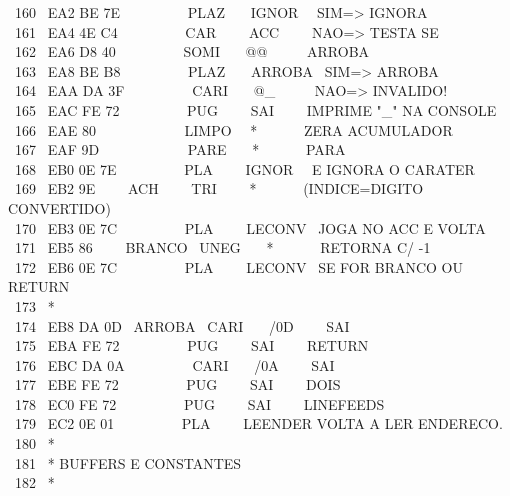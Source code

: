 \documentclass[a4paper,12pt]{article}
\begin{document}
\noindent \ 160 \ EA2 BE 7E \ \ \ \ \ \ \ \ \ PLAZ \ \ \ IGNOR \ \ SIM=> IGNORA\\
\phantom \ 161 \ EA4 4E C4 \ \ \ \ \ \ \ \ \ CAR \ \ \ \ ACC \ \ \ \ NAO=> TESTA SE\\
\phantom \ 162 \ EA6 D8 40 \ \ \ \ \ \ \ \ \ SOMI \ \ \ @@ \ \ \ \ \ ARROBA\\
\phantom \ 163 \ EA8 BE B8 \ \ \ \ \ \ \ \ \ PLAZ \ \ \ ARROBA \ SIM=> ARROBA\\
\phantom \ 164 \ EAA DA 3F \ \ \ \ \ \ \ \ \ CARI \ \ \ @\_ \ \ \ \ \ NAO=> INVALIDO!\\
\phantom \ 165 \ EAC FE 72 \ \ \ \ \ \ \ \ \ PUG \ \ \ \ SAI \ \ \ \ IMPRIME "\_" NA CONSOLE\\
\phantom \ 166 \ EAE 80 \ \ \ \ \ \ \ \ \ \ \ \ LIMPO \ \ * \ \ \ \ \ \ ZERA ACUMULADOR\\
\phantom \ 167 \ EAF 9D \ \ \ \ \ \ \ \ \ \ \ \ PARE \ \ \ * \ \ \ \ \ \ PARA\\
\phantom \ 168 \ EB0 0E 7E \ \ \ \ \ \ \ \ \ PLA \ \ \ \ IGNOR \ \ E IGNORA O CARATER\\
\phantom \ 169 \ EB2 9E \ \ \ \ ACH \ \ \ \ TRI \ \ \ \ * \ \ \ \ \ \ (INDICE=DIGITO CONVERTIDO)\\
\phantom \ 170 \ EB3 0E 7C \ \ \ \ \ \ \ \ \ PLA \ \ \ \ LECONV \ JOGA NO ACC E VOLTA\\
\phantom \ 171 \ EB5 86 \ \ \ \ BRANCO \ UNEG \ \ \ * \ \ \ \ \ \ RETORNA C/ -1\\
\phantom \ 172 \ EB6 0E 7C \ \ \ \ \ \ \ \ \ PLA \ \ \ \ LECONV \ SE FOR BRANCO OU RETURN\\
\phantom \ 173 \ *\\
\phantom \ 174 \ EB8 DA 0D \ ARROBA \ CARI \ \ \ /0D \ \ \ \ SAI\\
\phantom \ 175 \ EBA FE 72 \ \ \ \ \ \ \ \ \ PUG \ \ \ \ SAI \ \ \ \ RETURN\\
\phantom \ 176 \ EBC DA 0A \ \ \ \ \ \ \ \ \ CARI \ \ \ /0A \ \ \ \ SAI\\
\phantom \ 177 \ EBE FE 72 \ \ \ \ \ \ \ \ \ PUG \ \ \ \ SAI \ \ \ \ DOIS\\
\phantom \ 178 \ EC0 FE 72 \ \ \ \ \ \ \ \ \ PUG \ \ \ \ SAI \ \ \ \ LINEFEEDS\\
\phantom \ 179 \ EC2 0E 01 \ \ \ \ \ \ \ \ \ PLA \ \ \ \ LEENDER VOLTA A LER ENDERECO.\\
\phantom \ 180 \ *\\
\phantom \ 181 \ * BUFFERS E CONSTANTES\\
\phantom \ 182 \ *\\
\end{document}

